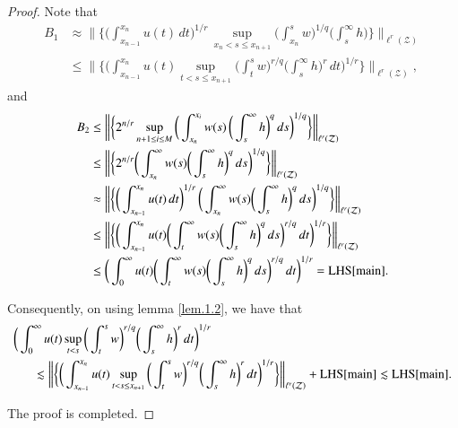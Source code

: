 \documentclass[12pt]{amsart}
\theoremstyle{plain}
\theoremstyle{definition}
\numberwithin{thm}{section}
\numberwithin{equation}{section}
\begin{document}
\begin{proof}
	Note that
	\begin{align*}
    B_1 & \approx \bigg\| \bigg\{ \bigg( \int_{x_{n-1}}^{x_n} u(t)\,dt \bigg)^{1/r} \, \sup_{x_n < s \le x_{n+1}} \bigg(
	\int_{x_n}^s w \bigg)^{1 / q} \bigg( \int_s^{\infty} h\bigg)  \bigg\} \bigg\|_{\ell^r({\mathcal Z})} \\
	& \le \bigg\| \bigg\{ \bigg( \int_{x_{n-1}}^{x_n} u(t) \sup_{t < s \le x_{n+1}} \bigg(
	\int_t^s w \bigg)^{r / q} \bigg( \int_s^{\infty} h\bigg)^r \,dt \bigg)^{1/r} \bigg\} \bigg\|_{\ell^r({\mathcal Z})},
	\end{align*}
	and
	\begin{align*}
	B_2	& \le \bigg\| \bigg\{ 2^{n / r} \sup_{n + 1 \le i \le M}  \bigg(
	\int_{x_n}^{x_i} w(s) \,\bigg( \int_s^{\infty} h\bigg)^q \,ds\bigg)^{1 / q} \bigg\} \bigg\|_{\ell^r({\mathcal Z})} \\
	& \le \bigg\| \bigg\{ 2^{n / r}  \bigg(
	\int_{x_n}^{\infty} w(s) \bigg( \int_s^{\infty} h\bigg)^q \,ds \bigg)^{1 / q} \bigg\} \bigg\|_{\ell^r({\mathcal Z})} \\
	& \approx \bigg\| \bigg\{ \bigg( \int_{x_{n-1}}^{x_n} u(t)\,dt \bigg)^{1/r}  \, \bigg(
	\int_{x_n}^{\infty} w(s) \bigg( \int_s^{\infty} h\bigg)^q \,ds \bigg)^{1 / q} \bigg\} \bigg\|_{\ell^r({\mathcal Z})} \\
	& \le \bigg\| \bigg\{ \bigg( \int_{x_{n-1}}^{x_n} u(t) \bigg(
	\int_t^{\infty} w(s) \bigg( \int_s^{\infty} h\bigg)^q \,ds \bigg)^{r / q}  \,dt \bigg)^{1/r} \bigg\} \bigg\|_{\ell^r({\mathcal Z})} \\
	& \le \bigg(\int_0^{\infty} u(t) \bigg( \int_t^{\infty} w (s) \bigg( \int_s^{\infty} h	\bigg)^q \,ds \bigg)^{r / q} \,dt \bigg)^{1/r} = {\operatorname{LHS}} \eqref{main}.
	\end{align*}

	Consequently, on using lemma \ref{lem.1.2}, we have that
	\begin{align*}
	\bigg( \int_0^{\infty}  u(t) \sup_{t < s} \bigg(
	\int_t^s w \bigg)^{r / q} \bigg( \int_s^{\infty} h\bigg)^r \,dt\bigg)^{1/r} & \\
	& \hspace{-5cm}  \lesssim  \bigg\| \bigg\{ \bigg( \int_{x_{n-1}}^{x_n} u(t) \sup_{t < s \le x_{n+1}} \bigg(
	\int_t^s w \bigg)^{r / q} \bigg( \int_s^{\infty} h\bigg)^r \,dt \bigg)^{1/r} \bigg\} \bigg\|_{\ell^r({\mathcal Z})} +  {\operatorname{LHS}} \eqref{main} \lesssim {\operatorname{LHS}} \eqref{main}.
	\end{align*}	

	The proof is completed.	
\end{proof}	
\end{document}
